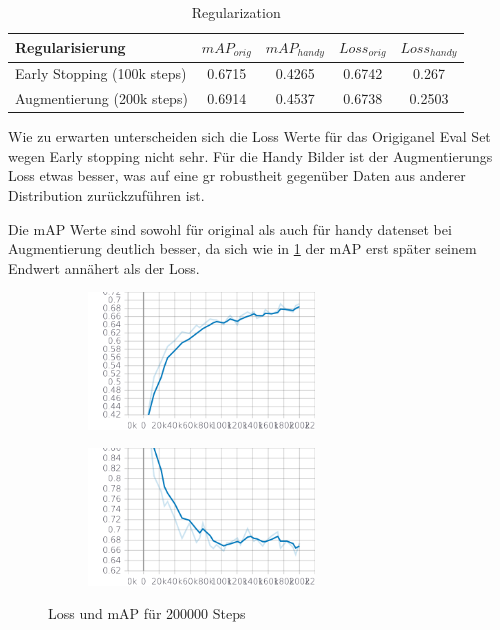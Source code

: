 \begin{table}[htb]
    \centering
    \label{tab:regularization}
    \begin{tabular}{| l || c | c | c | c |} 
        \hline
        Regularisierung & $mAP_{orig}$ & $mAP_{handy}$ & $Loss_{orig}$ &  $Loss_{handy}$\\
        \hline
        Early Stopping (100k steps) & 0.6715 & 0.4265 & 0.6742 & 0.267\\
        \hline
        Augmentierung (200k steps) & 0.6914 & 0.4537 & 0.6738 & 0.2503\\ %
        \hline
    \end{tabular}        
    \caption{Regularization}
\end{table}

Wie zu erwarten unterscheiden sich die Loss Werte für das Origiganel 
Eval Set wegen Early stopping nicht sehr. Für die Handy Bilder ist 
der Augmentierungs Loss etwas besser, was auf eine gr robustheit 
gegenüber Daten aus anderer Distribution zurückzuführen ist.

Die mAP Werte sind sowohl für original als auch für handy datenset 
bei Augmentierung deutlich besser, da sich wie in \ref{plot:map_loss} 
der mAP erst später seinem Endwert annähert als der Loss.


\begin{figure}[htb]
    \centering
    \begin{subfigure}{6cm}
        \centering
        \includegraphics[width=6cm]{./Bilder/eval/mAP.png} %
    \end{subfigure}
    \begin{subfigure}{6cm}
        \centering
        \includegraphics[width=6cm]{./Bilder/eval/loss.png}
    \end{subfigure}
    \caption{Loss und mAP für 200000 Steps}
    \label{plot:map_loss}
\end{figure}


